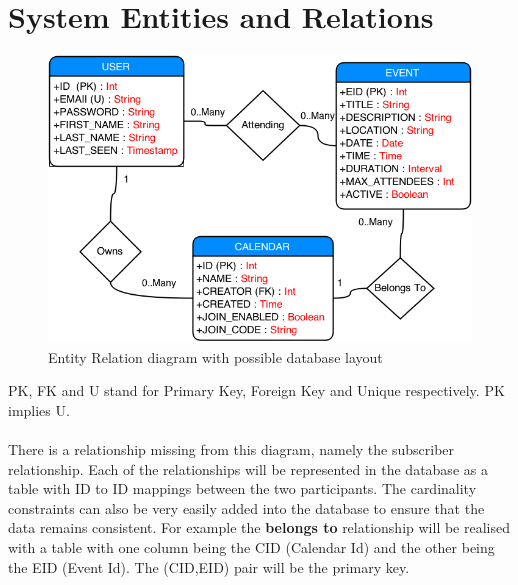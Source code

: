 \documentclass[10pt,a4paper]{article}
\begin{document}
\section{System Entities and Relations} 
\label{sec:er}
\begin{figure}[H]
\centerline{\includegraphics[scale=0.58,trim=0 0 100 0]{er}}
\caption{Entity Relation diagram with possible database layout}
\end{figure}
PK, FK and U stand for Primary Key, Foreign Key and Unique respectively. PK implies U.
\\
\\
\noindent
There is a relationship missing from this diagram, namely the subscriber relationship. Each of the relationships will be represented in the database as a table with ID to ID mappings between the two participants. The cardinality constraints can also be very easily added into the database to ensure that the data remains consistent. For example the \textbf{belongs to} relationship will be realised with a table with one column being the CID (Calendar Id) and the other being the EID (Event Id). The (CID,EID) pair will be the primary key.
\newpage
\end{document}
